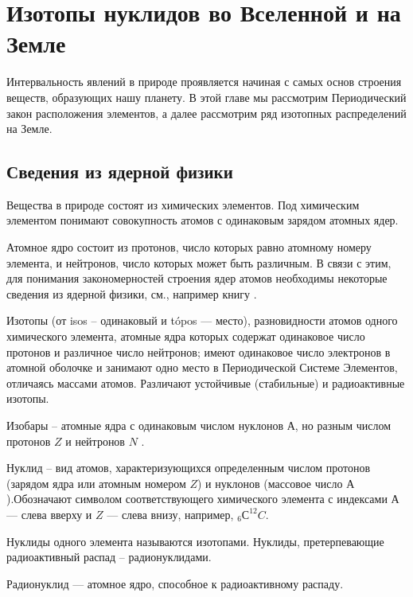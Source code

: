 \documentclass[a5paper,openany]{book}
\begin{document}

\chapter{Изотопы нуклидов во Вселенной и на Земле}\label{s:IntNature}

Интервальность явлений в природе проявляется начиная с самых основ строения веществ, образующих нашу планету. В этой главе мы рассмотрим Периодический закон расположения элементов, а далее рассмотрим ряд изотопных распределений на Земле.


\section{Сведения из ядерной физики}\label{s:NuclPhys} 

Вещества в природе состоят из химических элементов.
Под химическим элементом понимают совокупность атомов с одинаковым зарядом атомных ядер. 

Атомное ядро состоит из протонов, число которых равно атомному номеру элемента, и нейтронов, число которых может быть различным.  В связи с этим, для понимания закономерностей строения ядер атомов необходимы некоторые сведения из ядерной физики, см., например книгу \cite{NuclPhys}.

Изотопы (от isos – одинаковый и tópos — место), разновидности атомов одного химического элемента,
атомные ядра которых содержат одинаковое число протонов и различное число нейтронов; имеют одинаковое
число электронов в атомной оболочке и занимают одно место в Периодической Системе Элементов, отличаясь
массами атомов. Различают устойчивые (стабильные) и радиоактивные изотопы. 

Изобары –  атомные ядра с одинаковым числом нуклонов $А$, но разным числом протонов $Z$  и нейтронов $N$ .

Нуклид – вид атомов, характеризующихся определенным числом протонов (зарядом ядра или атомным номером 
$Z$) и нуклонов (массовое число $А$).Обозначают символом соответствующего химического элемента с индексами $А$ --- слева вверху и $Z$ --- слева внизу, например, $_6С^{12}C$.

Нуклиды одного элемента называются изотопами. Нуклиды, претерпевающие радиоактивный распад – радионуклидами.

Радионуклид ---  атомное ядро, способное к радиоактивному распаду. 
\end{document}
